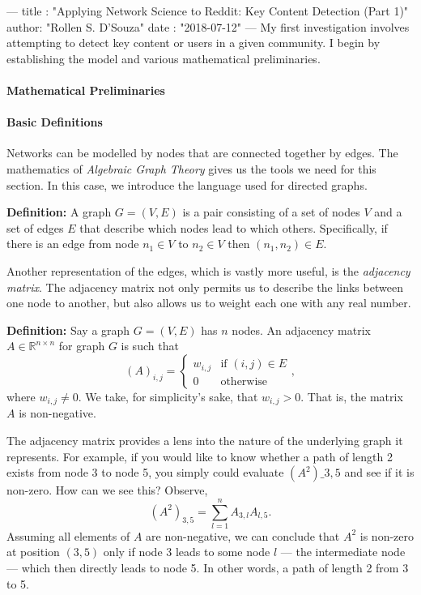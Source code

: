 ---
title :   "Applying Network Science to Reddit: Key Content Detection (Part 1)"
author:   "Rollen S. D'Souza"
date  :   "2018-07-12"
---
My first investigation involves attempting to detect key content or users in a given community.
I begin by establishing the model and various mathematical preliminaries.

\paragraph{Mathematical Preliminaries}

\paragraph{Basic Definitions}
Networks can be modelled by nodes that are connected together by edges.
The mathematics of \emph{Algebraic Graph Theory} gives us the tools we need for this section.
In this case, we introduce the language used for directed graphs.

\textbf{Definition:} A graph \(G = (V, E)\) is a pair consisting of a set of nodes \(V\) and a set of edges \(E\) that describe which nodes lead to which others.
Specifically, if there is an edge from node \(n_1 \in V\) to \(n_2 \in V\) then \((n_1, n_2) \in E.\)

Another representation of the edges, which is vastly more useful, is the \emph{adjacency matrix}.
The adjacency matrix not only permits us to describe the links between one node to another, but also allows us to weight each one with any real number.

\textbf{Definition:} Say a graph \(G=(V,E)\) has \(n\) nodes.
An adjacency matrix \(A\in \mathbb{R}^{n\times n}\) for graph \(G\) is such that
\[
  (A)_{i,j}
    =
      \begin{cases}
        w_{i,j}  & \text{if } (i,j) \in E \\
        0 & \text{otherwise}
      \end{cases},
\]
where \(w_{i,j} \neq 0.\)
We take, for simplicity's sake, that \(w_{i,j} > 0.\)
That is, the matrix \(A\) is non-negative.

The adjacency matrix provides a lens into the nature of the underlying graph it represents.
For example, if you would like to know whether a path of length 2 exists from node 3 to node 5, you simply could evaluate \((A^2)\_{3,5}\) and see if it is non-zero.
How can we see this? Observe,
\[(A^2)_{3,5} = \sum_{l = 1}^n A_{3,l} A_{l, 5}.\]
Assuming all elements of \(A\) are non-negative, we can conclude that \(A^2\) is non-zero at position \((3,5)\) only if node 3 leads to some node \(l\) --- the intermediate node --- which then directly leads to node 5.
In other words, a path of length 2 from 3 to 5.

